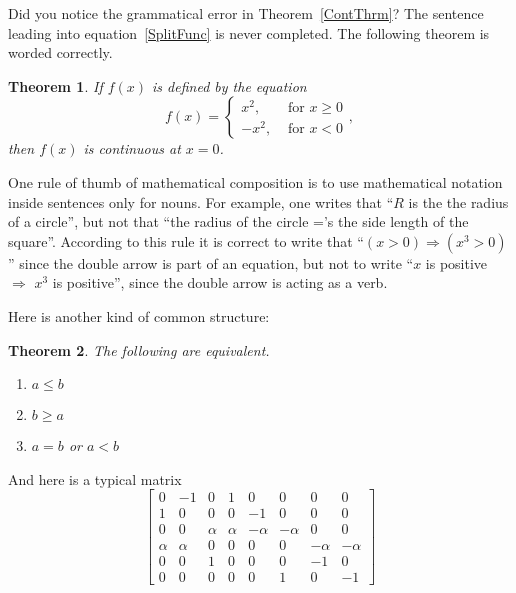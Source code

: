 \documentclass{article}
\newtheorem{theorem}{Theorem}
\begin{document}
   Did you notice the grammatical error in
   Theorem~\ref{ContThrm}?  The sentence leading
   into equation~\ref{SplitFunc} is never completed.
   The following
   theorem is worded correctly.
\begin{theorem}
    If $f(x)$ is defined by the equation
    \begin{equation}
         f(x) = \left\{ \begin{array}{rl}
                          x^{2}, & \mbox{~for $x \geq 0$} \\
                         -x^{2}, & \mbox{~for $x < 0$}
                         \end{array}\right.,
   \end{equation}
   then $f(x)$ is continuous at $x=0$.
\end{theorem}

   One rule of thumb of mathematical composition is to
   use mathematical notation inside sentences only for
   nouns.  For example, one writes that ``$R$ is the the
   radius of a circle'', but not that ``the radius of the
   circle ='s the side length of the square''.  According to
   this rule it is correct to write that
   ``$(x>0) \Rightarrow (x^{3} > 0)$'' since the double arrow is part of
   an equation, but not to write
   ``$x$ is positive $\Rightarrow$ $x^{3}$ is positive'', since the
   double arrow is acting as a verb.

Here is another kind of common structure:

\begin{theorem}
   The following are equivalent.
   \begin{enumerate}
      \item $a \leq b$
      \item $b \geq a$
      \item $a = b$ or $a<b$
   \end{enumerate}
\end{theorem}

And here is a typical matrix
 $$
 \left[
 \begin{array}{rrrrrrrr}
    0 & -1 & 0 & 1 & 0 & 0 & 0 & 0  \\
    1 & 0 & 0 & 0 & -1 & 0 & 0 & 0  \\
    0 & 0 & \alpha & \alpha & -\alpha & -\alpha & 0 & 0  \\
    \alpha & \alpha & 0 & 0 & 0 & 0 & -\alpha & -\alpha  \\
    0 & 0 & 1 & 0 & 0 & 0 & -1 & 0  \\
    0 & 0 & 0 & 0 & 0 & 1 & 0 & -1
 \end{array}
 \right]
 $$
\end{document}
